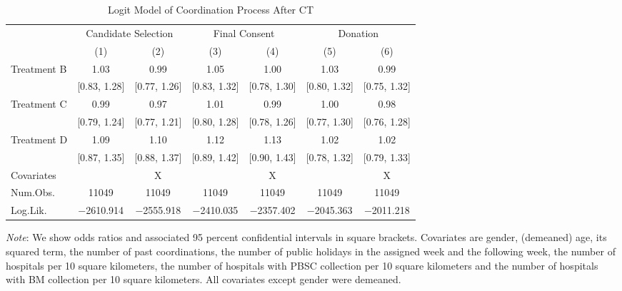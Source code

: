 \documentclass[12pt, a4paper]{article}
\begin{document}
\begin{table}[H]
\caption{\label{tab:logit-coordinate}Logit Model of Coordination Process After CT}
\centering
\fontsize{8}{10}\selectfont
\begin{threeparttable}
\begin{tabular}[t]{lcccccc}
\toprule
\multicolumn{1}{c}{ } & \multicolumn{2}{c}{Candidate Selection} & \multicolumn{2}{c}{Final Consent} & \multicolumn{2}{c}{Donation} \\
\cmidrule(l{3pt}r{3pt}){2-3} \cmidrule(l{3pt}r{3pt}){4-5} \cmidrule(l{3pt}r{3pt}){6-7}
  & (1) & (2) & (3) & (4) & (5) & (6)\\
\midrule
Treatment B & \num{1.03} & \num{0.99} & \num{1.05} & \num{1.00} & \num{1.03} & \num{0.99}\\
 & {}[\num{0.83}, \num{1.28}] & {}[\num{0.77}, \num{1.26}] & {}[\num{0.83}, \num{1.32}] & {}[\num{0.78}, \num{1.30}] & {}[\num{0.80}, \num{1.32}] & {}[\num{0.75}, \num{1.32}]\\
Treatment C & \num{0.99} & \num{0.97} & \num{1.01} & \num{0.99} & \num{1.00} & \num{0.98}\\
 & {}[\num{0.79}, \num{1.24}] & {}[\num{0.77}, \num{1.21}] & {}[\num{0.80}, \num{1.28}] & {}[\num{0.78}, \num{1.26}] & {}[\num{0.77}, \num{1.30}] & {}[\num{0.76}, \num{1.28}]\\
Treatment D & \num{1.09} & \num{1.10} & \num{1.12} & \num{1.13} & \num{1.02} & \num{1.02}\\
 & {}[\num{0.87}, \num{1.35}] & {}[\num{0.88}, \num{1.37}] & {}[\num{0.89}, \num{1.42}] & {}[\num{0.90}, \num{1.43}] & {}[\num{0.78}, \num{1.32}] & {}[\num{0.79}, \num{1.33}]\\
\midrule
Covariates &  & X &  & X &  & X\\
Num.Obs. & \num{11049} & \num{11049} & \num{11049} & \num{11049} & \num{11049} & \num{11049}\\
Log.Lik. & \num{-2610.914} & \num{-2555.918} & \num{-2410.035} & \num{-2357.402} & \num{-2045.363} & \num{-2011.218}\\
\bottomrule
\end{tabular}
\begin{tablenotes}
\item \emph{Note}: We show odds ratios and associated 95 percent confidential intervals in square brackets. Covariates are gender, (demeaned) age, its squared term, the number of past coordinations, the number of public holidays in the assigned week and the following week, the number of hospitals per 10 square kilometers, the number of hospitals with PBSC collection per 10 square kilometers and the number of hospitals with BM collection per 10 square kilometers. All covariates except gender were demeaned.
\end{tablenotes}
\end{threeparttable}
\end{table}
\end{document}
